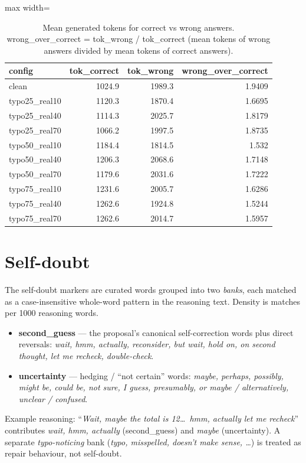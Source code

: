 \documentclass[11pt]{article}
\begin{document}
\begin{table}[H]
\centering
\caption{Mean generated tokens for correct vs wrong answers. wrong\_over\_correct = tok\_wrong / tok\_correct (mean tokens of wrong answers divided by mean tokens of correct answers).}
\small
\begin{adjustbox}{max width=\textwidth}
\begin{tabular}{lrrr}
\toprule
\textbf{config} & \textbf{tok\_correct} & \textbf{tok\_wrong} & \textbf{wrong\_over\_correct} \\
\midrule
clean & 1024.9 & 1989.3 & 1.9409 \\
typo25\_real10 & 1120.3 & 1870.4 & 1.6695 \\
typo25\_real40 & 1114.3 & 2025.7 & 1.8179 \\
typo25\_real70 & 1066.2 & 1997.5 & 1.8735 \\
typo50\_real10 & 1184.4 & 1814.5 & 1.532 \\
typo50\_real40 & 1206.3 & 2068.6 & 1.7148 \\
typo50\_real70 & 1179.6 & 2031.6 & 1.7222 \\
typo75\_real10 & 1231.6 & 2005.7 & 1.6286 \\
typo75\_real40 & 1262.6 & 1924.8 & 1.5244 \\
typo75\_real70 & 1262.6 & 2014.7 & 1.5957 \\
\bottomrule
\end{tabular}
\end{adjustbox}
\end{table}

\section*{Self-doubt}
\noindent The self-doubt markers are curated words grouped into two
\emph{banks}, each matched as a case-insensitive whole-word pattern in the reasoning
text. Density is matches per 1000 reasoning words.
\begin{itemize}\setlength{\itemsep}{1pt}
  \item \textbf{second\_guess} --- the proposal's canonical self-correction words plus
  direct reversals: \emph{wait, hmm, actually, reconsider, but wait, hold on, on second
  thought, let me recheck, double-check}.
  \item \textbf{uncertainty} --- hedging / ``not certain'' words: \emph{maybe, perhaps,
  possibly, might be, could be, not sure, I guess, presumably, or maybe / alternatively,
  unclear / confused}.
\end{itemize}
\noindent Example reasoning: ``\emph{Wait, maybe the total is 12\dots\ hmm, actually let
me recheck}'' contributes \emph{wait, hmm, actually} (second\_guess) and \emph{maybe}
(uncertainty). A separate \emph{typo-noticing} bank (\emph{typo, misspelled, doesn't make
sense, \dots}) is treated as repair behaviour, not self-doubt.
\medskip
\end{document}
